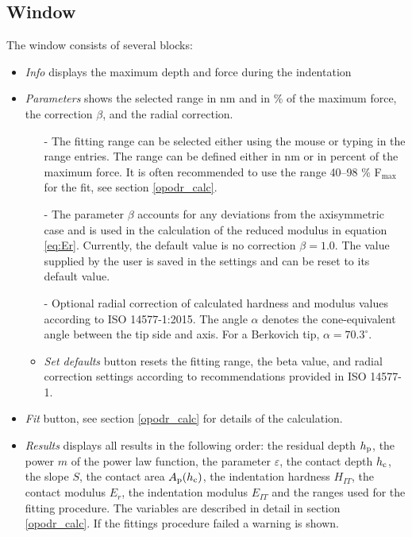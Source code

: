 \subsection{Window}
The window consists of several blocks:
\begin{itemize}
 \item \emph{Info} displays the maximum depth and force during the indentation
 \item \emph{Parameters} shows the selected range in nm and in \% of the maximum force, the correction $\beta$, and the radial correction. 
        \begin{itemize}
          \item[-] The fitting range can be selected either using the mouse or typing in the range entries. The range can be defined either in nm or in percent of the maximum force. 
                   It is often recommended to use the range 40--98 \% F$_\mathrm{max}$ for the fit, see section \ref{opodr_calc}.  
          \item[-] The parameter $\beta$ accounts for any deviations from the axisymmetric case and is used in the calculation of the reduced modulus in equation \eqref{eq:Er}. 
                   Currently, the default value is no correction $\beta = 1.0$. The value supplied by the user is saved in the settings and can be reset to its default value.
                 \item[-] Optional radial correction of calculated hardness and modulus values according to ISO 14577-1:2015. The angle $\alpha$ denotes the cone-equivalent angle between the tip side and axis. For a Berkovich tip, $\alpha = 70.3^\circ$.
                   \item \emph{Set defaults} button resets the fitting range, the beta value, and radial correction settings according to recommendations provided in ISO 14577-1.
          \end{itemize}
 \item \emph{Fit} button, see section \ref{opodr_calc} for details of the calculation.
 \item \emph{Results} displays all results in the following order: the residual depth $h_\mathrm{p}$, the power $m$ of the power law function, the parameter $\varepsilon$, 
       the contact depth  $h_\mathrm{c}$, the slope $S$, the contact area $A_\mathrm{p}(h_\mathrm{c})$, the indentation hardness $H_{IT}$, the contact modulus $E_r$, the indentation modulus $E_{IT}$ and the ranges used for the fitting procedure.
       The variables are described in detail in section \ref{opodr_calc}. If the fittings procedure failed a warning is shown.

\end{itemize}

